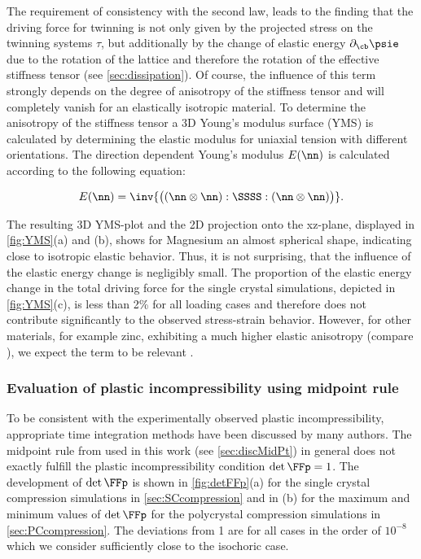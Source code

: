   The requirement of consistency with the second law, leads to the finding that the driving force for twinning is not only given by the projected stress on the twinning systems $\tau$, but additionally by the change of elastic energy $\partial_{\cb}\psie$ due to the rotation of the lattice and therefore the rotation of the effective stiffness tensor (see \cref{sec:dissipation}). Of course, the influence of this term strongly depends on the degree of anisotropy of the stiffness tensor and will completely vanish for an elastically isotropic material. To determine the anisotropy of the stiffness tensor a 3D Young's modulus surface (YMS) is calculated by determining the elastic modulus for uniaxial tension with different orientations. The direction dependent Young's modulus $E(\nn)$ is calculated according to the following equation: 
  
  \begin{align}
    E(\nn) = \inv{\big((\nn \otimes \nn) : \SSSS : (\nn \otimes \nn)\big)}.
  \end{align}
  
  The resulting 3D YMS-plot and the 2D projection onto the xz-plane, displayed in \cref{fig:YMS}(a) and (b), shows for Magnesium an almost spherical shape, indicating close to isotropic elastic behavior. Thus, it is not surprising, that the influence of the elastic energy change is negligibly small. The proportion of the elastic energy change in the total driving force for the single crystal simulations, depicted in \cref{fig:YMS}(c), is less than 2\% for all loading cases and therefore does not contribute significantly to the observed stress-strain behavior. However, for other materials, for example zinc, exhibiting a much higher elastic anisotropy (compare ), we expect the term to be relevant . 
  
  
  \subsubsection{Evaluation of plastic incompressibility using midpoint rule}\label{sec:EvalIsoPlas} %
  
  To be consistent with the experimentally observed plastic incompressibility, appropriate time integration methods have been discussed by many authors\supercite{dafaliasPlasticSpinNecessity1998,ortizVariationalFormulationViscoplastic1999,motaLiegroupInterpolationVariational2013}. The midpoint rule from  used in this work (see \cref{sec:discMidPt}) in general does not exactly fulfill the plastic incompressibility condition $\det{\FFp}=1$. The development of $\det{\FFp}$ is shown in \cref{fig:detFFp}(a) for the single crystal compression simulations in \cref{sec:SCcompression} and in (b) for the maximum and minimum values of $\det{\FFp}$ for the polycrystal compression simulations in \cref{sec:PCcompression}. The deviations from 1 are for all cases in the order of $10^{-8}$ which we consider sufficiently close to the isochoric case. 
  
